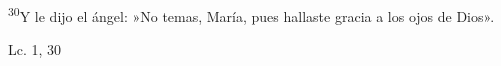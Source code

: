 \documentclass[../../rosario.tex]{subfiles}
\begin{document}
    \textsuperscript{30}Y le dijo el ángel: »No temas, María, pues hallaste gracia a los ojos de Dios».
    \begin{flushright}
    Lc. 1, 30
    \end{flushright}
\end{document}
